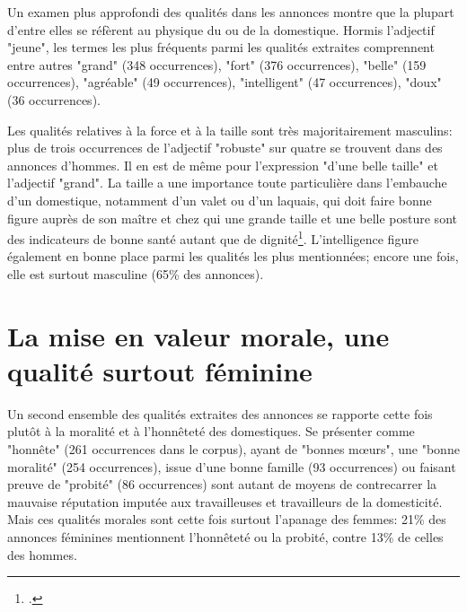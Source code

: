 {Un examen plus approfondi des qualités dans les annonces montre que la plupart d'entre elles se réfèrent au physique du ou de la domestique. Hormis l'adjectif "jeune", les termes les plus fréquents parmi les qualités extraites comprennent entre autres "grand" (348 occurrences), "fort" (376 occurrences), "belle" (159 occurrences), "agréable" (49 occurrences), "intelligent" (47 occurrences), "doux" (36 occurrences).

Les qualités relatives à la force et à la taille sont très majoritairement masculins: plus de trois occurrences de l'adjectif "robuste" sur quatre se trouvent dans des annonces d'hommes. Il en est de même pour l'expression "d'une belle taille" et l'adjectif "grand". La taille a une importance toute particulière dans l'embauche d'un domestique, notamment d'un valet ou d'un laquais, qui doit faire bonne figure auprès de son maître et chez qui une grande taille et une belle posture sont des indicateurs de bonne santé autant que de dignité\footcites{sabattierChapitreConditionDomestique1984}. L'intelligence figure également en bonne place parmi les qualités les plus mentionnées; encore une fois, elle est surtout masculine (65\% des annonces). 


\section{La mise en valeur morale, une qualité surtout féminine}

Un second ensemble des qualités extraites des annonces se rapporte cette fois plutôt à la moralité et à l'honnêteté des domestiques. Se présenter comme "honnête" (261 occurrences dans le corpus), ayant de "bonnes mœurs", une "bonne moralité" (254 occurrences), issue d'une bonne famille (93 occurrences) ou faisant preuve de "probité" (86 occurrences) sont autant de moyens de contrecarrer la mauvaise réputation imputée aux travailleuses et travailleurs de la domesticité. Mais ces qualités morales sont cette fois surtout l'apanage des femmes: 21\% des annonces féminines mentionnent l'honnêteté ou la probité, contre 13\% de celles des hommes. 

}
